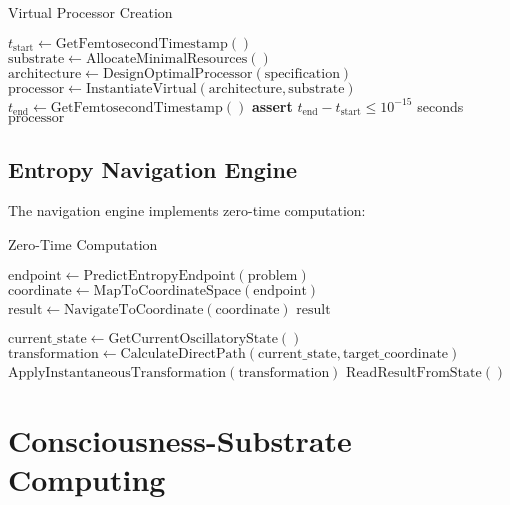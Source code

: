 \documentclass[12pt,a4paper]{article}
\begin{document}
\begin{algorithm}
\caption{Virtual Processor Creation}
\begin{algorithmic}[1]
    \State $t_{\text{start}} \leftarrow \text{GetFemtosecondTimestamp}()$
    \State $\text{substrate} \leftarrow \text{AllocateMinimalResources}()$
    \State $\text{architecture} \leftarrow \text{DesignOptimalProcessor}(\text{specification})$
    \State $\text{processor} \leftarrow \text{InstantiateVirtual}(\text{architecture}, \text{substrate})$
    \State $t_{\text{end}} \leftarrow \text{GetFemtosecondTimestamp}()$
    \State \textbf{assert} $t_{\text{end}} - t_{\text{start}} \leq 10^{-15}$ seconds
    \State \Return $\text{processor}$
\EndProcedure
\end{algorithmic}
\end{algorithm}

\subsection{Entropy Navigation Engine}

The navigation engine implements zero-time computation:

\begin{algorithm}
\caption{Zero-Time Computation}
\begin{algorithmic}[1]
    \State $\text{endpoint} \leftarrow \text{PredictEntropyEndpoint}(\text{problem})$
    \State $\text{coordinate} \leftarrow \text{MapToCoordinateSpace}(\text{endpoint})$
    \State $\text{result} \leftarrow \text{NavigateToCoordinate}(\text{coordinate})$
    \State \Return $\text{result}$
\EndProcedure

    \State $\text{current\_state} \leftarrow \text{GetCurrentOscillatoryState}()$
    \State $\text{transformation} \leftarrow \text{CalculateDirectPath}(\text{current\_state}, \text{target\_coordinate})$
    \State $\text{ApplyInstantaneousTransformation}(\text{transformation})$
    \State \Return $\text{ReadResultFromState}()$
\EndProcedure
\end{algorithmic}
\end{algorithm}

\section{Consciousness-Substrate Computing}
\end{document}
